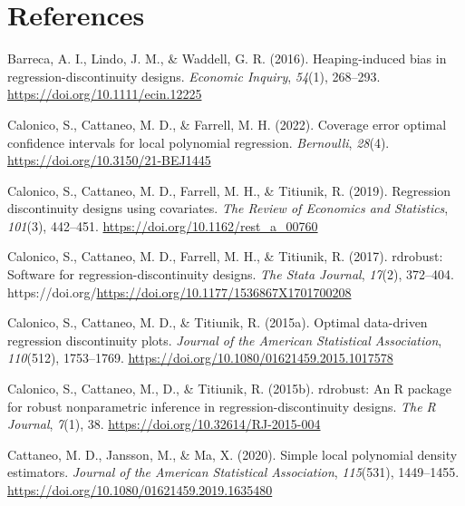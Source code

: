 \documentclass[
  11pt,
]{article}
\newlength{\cslhangindent}
\newlength{\cslentryspacingunit} %
\newenvironment{CSLReferences}[2] %
 {%
  \setlength{\parindent}{0pt}
  \ifodd #1
  \let\oldpar\par
  \def\par{\hangindent=\cslhangindent\oldpar}
  \fi
  \setlength{\parskip}{#2\cslentryspacingunit}
 }%
 {}
\begin{document}
\newpage

\hypertarget{references}{%
\section*{References}\label{references}}

\hypertarget{refs}{}
\begin{CSLReferences}{1}{0}
\leavevmode{}%
Barreca, A. I., Lindo, J. M., \& Waddell, G. R. (2016). Heaping-induced
bias in regression-discontinuity designs. \emph{Economic Inquiry},
\emph{54}(1), 268--293. \url{https://doi.org/10.1111/ecin.12225}

\leavevmode{}%
Calonico, S., Cattaneo, M. D., \& Farrell, M. H. (2022). Coverage error
optimal confidence intervals for local polynomial regression.
\emph{Bernoulli}, \emph{28}(4). \url{https://doi.org/10.3150/21-BEJ1445}

\leavevmode{}%
Calonico, S., Cattaneo, M. D., Farrell, M. H., \& Titiunik, R. (2019).
Regression discontinuity designs using covariates. \emph{The Review of
Economics and Statistics}, \emph{101}(3), 442--451.
\url{https://doi.org/10.1162/rest_a_00760}

\leavevmode{}%
Calonico, S., Cattaneo, M. D., Farrell, M. H., \& Titiunik, R. (2017).
{rdrobust}: Software for regression-discontinuity designs. \emph{The
Stata Journal}, \emph{17}(2), 372--404.
https://doi.org/\url{https://doi.org/10.1177/1536867X1701700208}

\leavevmode{}%
Calonico, S., Cattaneo, M. D., \& Titiunik, R. (2015a). Optimal
data-driven regression discontinuity plots. \emph{Journal of the
American Statistical Association}, \emph{110}(512), 1753--1769.
\url{https://doi.org/10.1080/01621459.2015.1017578}

\leavevmode{}%
Calonico, S., Cattaneo, M., D., \& Titiunik, R. (2015b). {rdrobust}: An
{R} package for robust nonparametric inference in
regression-discontinuity designs. \emph{The R Journal}, \emph{7}(1), 38.
\url{https://doi.org/10.32614/RJ-2015-004}

\leavevmode{}%
Cattaneo, M. D., Jansson, M., \& Ma, X. (2020). Simple local polynomial
density estimators. \emph{Journal of the American Statistical
Association}, \emph{115}(531), 1449--1455.
\url{https://doi.org/10.1080/01621459.2019.1635480}


\end{CSLReferences}
\end{document}
